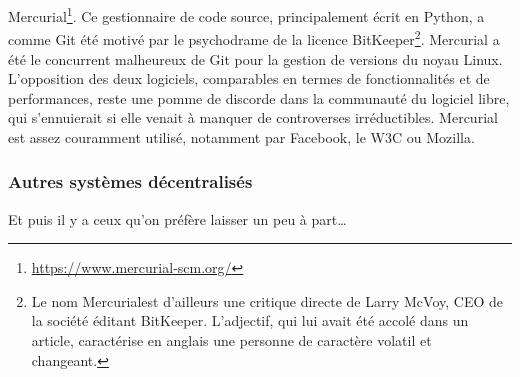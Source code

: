 \begin{itemize}
{    Mercurial\footnote{\url{https://www.mercurial-scm.org/}}.}
  Ce gestionnaire de code source, principalement écrit en Python, a
  comme Git été motivé par le psychodrame de la licence
  BitKeeper\footnote{Le nom \og Mercurial\fg est d'ailleurs une
    critique directe de Larry McVoy, CEO de la société éditant
    BitKeeper. L'adjectif, qui lui avait été accolé dans un article,
    caractérise en anglais une personne de caractère volatil et
    changeant.}. Mercurial a été le concurrent malheureux de Git pour
  la gestion de versions du noyau Linux. L'opposition des deux
  logiciels, comparables en termes de fonctionnalités et de
  performances, reste une pomme de discorde dans la communauté du
  logiciel libre, qui s'ennuierait si elle venait à manquer de
  controverses irréductibles. Mercurial est assez couramment utilisé,
  notamment par Facebook, le W3C ou Mozilla.
\end{itemize}

\subsubsection{Autres systèmes décentralisés}

Et puis il y a ceux qu'on préfère laisser un peu à part\ldots

